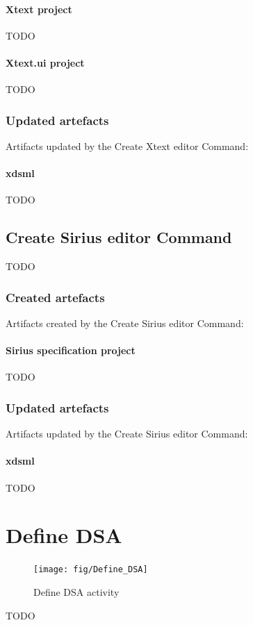 \documentclass{gemoc} %
\begin{document}
\paragraph{Xtext project} 
TODO\paragraph{Xtext.ui project} 
TODO
\subsubsection{Updated artefacts}
Artifacts updated by the Create Xtext editor Command:
\paragraph{xdsml} 
TODO

\subsection{Create Sirius editor Command}
TODO
\subsubsection{Created artefacts}
Artifacts created by the Create Sirius editor Command:
\paragraph{Sirius specification project} 
TODO
\subsubsection{Updated artefacts}
Artifacts updated by the Create Sirius editor Command:
\paragraph{xdsml} 
TODO

\section{Define DSA}
\label{sec:Define_DSA}
\begin{figure}[h!]
		\center
		\texttt{[image: fig/Define\_DSA]}
		\caption{Define DSA activity}
		\label{fig:Define_DSA}
\end{figure}

TODO
\end{document}
